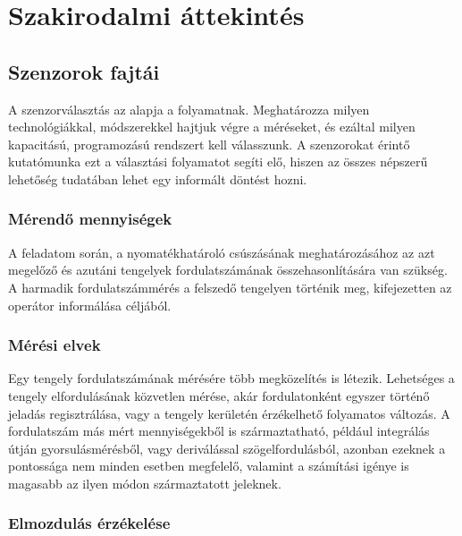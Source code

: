 \chapter{Szakirodalmi áttekintés}
\label{sec:Szakirodalom}
\section{Szenzorok fajtái}

A szenzorválasztás az alapja a folyamatnak. Meghatározza milyen technológiákkal, módszerekkel hajtjuk végre a méréseket, és ezáltal milyen kapacitású, programozású rendszert kell válasszunk. A szenzorokat érintő kutatómunka ezt a választási folyamatot segíti elő, hiszen az összes népszerű lehetőség tudatában lehet egy informált döntést hozni.

\subsection{Mérendő mennyiségek}

A feladatom során, a nyomatékhatároló csúszásának meghatározásához az azt megelőző és azutáni tengelyek fordulatszámának összehasonlítására van szükség. A harmadik fordulatszámmérés a felszedő tengelyen történik meg, kifejezetten az operátor informálása céljából. 

\subsection{Mérési elvek}

Egy tengely fordulatszámának mérésére több megközelítés is létezik. Lehetséges a tengely elfordulásának közvetlen mérése, akár fordulatonként egyszer történő jeladás regisztrálása, vagy a tengely kerületén érzékelhető folyamatos változás. A fordulatszám más mért mennyiségekből is származtatható, például integrálás útján gyorsulásmérésből, vagy deriválással szögelfordulásból, azonban ezeknek a pontossága nem minden esetben megfelelő, valamint a számítási igénye is magasabb az ilyen módon származtatott jeleknek.\\

\subsection{Elmozdulás érzékelése}


